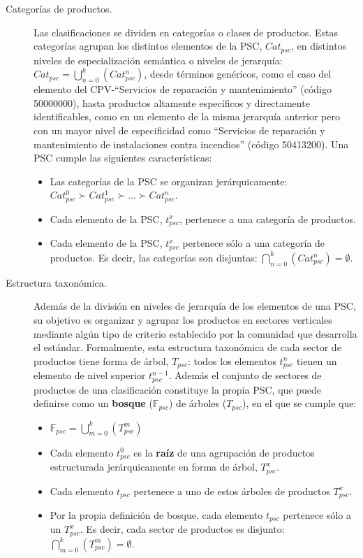 \begin{description}
 \item [Categorías de productos.] Las clasificaciones se dividen en categorías o
clases de productos. Estas categorías agrupan los distintos elementos de la PSC,
$Cat_{psc}$, en distintos niveles de especialización semántica o niveles de
jerarquía: $Cat_{psc} = \displaystyle\bigcup_{n=0}^k{(Cat_{psc}^n)}$, desde
términos genéricos, como el caso del elemento del \gls{CPV}-``Servicios de reparación y mantenimiento'' (código 50000000), hasta productos altamente
específicos y directamente identificables, como en un elemento de la misma jerarquía anterior pero con un mayor nivel 
de especificidad como ``Servicios de reparación y mantenimiento de instalaciones contra incendios'' (código 50413200). Una PSC cumple las siguientes
características:
\begin{itemize}
 \item Las categorías de la PSC se organizan jerárquicamente: $Cat_{psc}^0\succ
Cat_{psc}^1\succ...\succ Cat_{psc}^n $.
 \item Cada elemento de la PSC, $t_{psc}^x$, pertenece a una categoría de
productos.
 \item Cada elemento de la PSC, $t_{psc}^x$ pertenece sólo a una categoría de
productos. Es decir, las categorías son disjuntas:
$\displaystyle\bigcap_{n=0}^k{(Cat_{psc}^n)}=\emptyset$.
\end{itemize}


\item  [Estructura taxonómica.] Además de la división en niveles de jerarquía
de los elementos de una \gls{PSC}, su objetivo es organizar y agrupar los productos en
sectores verticales mediante algún tipo de criterio establecido por la comunidad
que desarrolla el estándar. Formalmente, esta estructura taxonómica de cada
sector de productos tiene forma de árbol, $T_{psc}$: todos los elementos
$t_{psc}^n$ tienen un elemento de nivel superior $t_{psc}^{n-1}$. Además el
conjunto de sectores de productos de una clasificación constituye la propia PSC,
que puede definirse como un \textbf{bosque} ($\mathbb{F}_{psc}$) de árboles
($T_{psc}$), en el que se cumple que:
\begin{itemize}
 \item $\mathbb{F}_{psc}= \displaystyle\bigcup_{m=0}^k{(T_{psc}^m)}$
 \item Cada elemento $t_{psc}^0$ es la \textbf{raíz} de una agrupación de
productos estructurada jerárquicamente en forma de árbol, $T_{psc}^x$.
 \item Cada elemento $t_{psc}$ pertenece a uno de estos árboles de productos
$T_{psc}^x$.
 \item Por la propia definición de bosque, cada elemento $t_{psc}$ pertenece sólo
a un $T_{psc}^x$. Es decir, cada sector de productos es disjunto:
$\displaystyle\bigcap_{m=0}^k{(T_{psc}^m)}=\emptyset$.
\end{itemize}
 
\end{description}


